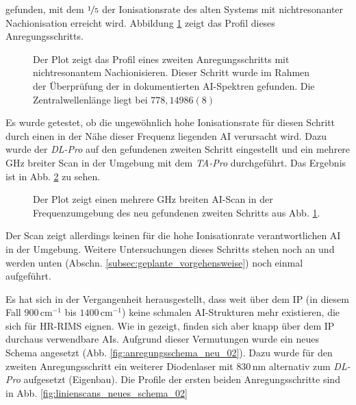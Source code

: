 gefunden, mit dem $\nicefrac{1}{5}$ der Ionisationsrate des alten Systems mit
nichtresonanter Nachionisation erreicht wird. Abbildung
\ref{fig:linienscans_neues_schema_01_fake_AI_krass_mean} zeigt das Profil dieses
Anregungsschritts.
\begin{figure}[h]
 	\centering
 	\footnotesize
	
	\caption[zweiter Schritt aus AI-Spektren]{Der Plot zeigt das Profil
	eines zweiten Anregungsschritts mit nichtresonantem Nachionisieren. Dieser Schritt wurde im
	Rahmen der Überprüfung der in \cite{raeder:2011:dissertation} dokumentierten
	AI-Spektren gefunden. Die Zentralwellenlänge liegt bei $778,14986(8)$}
	\label{fig:linienscans_neues_schema_01_fake_AI_krass_mean}
\end{figure}
Es wurde getestet, ob die ungewöhnlich hohe Ionisationsrate für
diesen Schritt durch einen in der Nähe dieser Frequenz liegenden AI verursacht
wird. Dazu wurde der \textit{DL-Pro} auf den gefundenen zweiten Schritt
eingestellt und ein mehrere GHz breiter Scan in der Umgebung mit dem \textit{TA-Pro} durchgeführt.
Das Ergebnis ist in Abb.
\ref{fig:linienscans_neues_schema_01_fake_AI_krass_umgebung_mean} zu sehen.
\begin{figure}[h]
 	\centering
 	\footnotesize
	
	\caption[zweiter Schritt aus AI-Spektren, Umgebungsscan]{Der Plot zeigt
	einen mehrere GHz breiten AI-Scan in der Frequenzumgebung des neu
	gefundenen zweiten Schritts aus Abb.
	\ref{fig:linienscans_neues_schema_01_fake_AI_krass_mean}.}
	\label{fig:linienscans_neues_schema_01_fake_AI_krass_umgebung_mean}
\end{figure}
Der Scan zeigt allerdings keinen für die hohe Ionisationrate verantwortlichen AI
in der Umgebung. Weitere Untersuchungen dieses
Schritts stehen noch an und werden unten (Abschn. \ref{subsec:geplante_vorgehensweise}) noch einmal
aufgeführt.\par Es hat sich in der Vergangenheit herausgestellt, dass weit
über dem IP (in diesem Fall $900\,$cm$^{-1}$ bis $1400\,$cm$^{-1}$) keine
schmalen AI-Strukturen mehr existieren, die sich für HR-RIMS eignen. Wie in
\cite{Bushaw2007485} gezeigt, finden sich aber knapp über dem IP durchaus verwendbare AIs.
Aufgrund dieser Vermutungen wurde ein neues Schema angesetzt
(Abb. \ref{fig:anregungsschema_neu_02}). Dazu wurde für den zweiten
Anregungsschritt ein weiterer Diodenlaser mit $830\,$nm alternativ zum
\textit{DL-Pro} aufgesetzt (Eigenbau). Die Profile der ersten beiden
Anregungsschritte sind in Abb. \ref{fig:linienscans_neues_schema_02}
